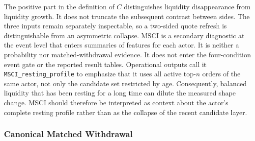 \documentclass[11pt]{article}
\newenvironment{review}{\begingroup\color{blue}}{\endgroup}
\begin{document}
The positive part in the definition of $C$ distinguishes liquidity disappearance from liquidity growth. It does not truncate
\begin{review}the subsequent contrast between sides\end{review}. The three inputs remain separately inspectable, so a two-sided quote refresh is
distinguishable from an asymmetric collapse. MSCI is \begin{review}a secondary diagnostic at the event level that enters summaries of features for each actor\end{review}. It is neither a probability nor matched-withdrawal evidence. It does not enter the four-condition event gate or the
reported result tables. Operational outputs call it \texttt{MSCI\_resting\_profile} to emphasize that it uses \begin{review}all active top-$n$ orders of the same actor, not only the candidate set restricted by age\end{review}. Consequently, \begin{review}balanced liquidity that has been resting for a long time\end{review} can dilute
the measured shape change. MSCI should therefore be interpreted as context about the actor's complete resting profile rather
than as the collapse of the recent candidate layer.

\subsubsection{Canonical Matched Withdrawal}
\label{subsec:canonical_matched_withdrawal}
\end{document}
